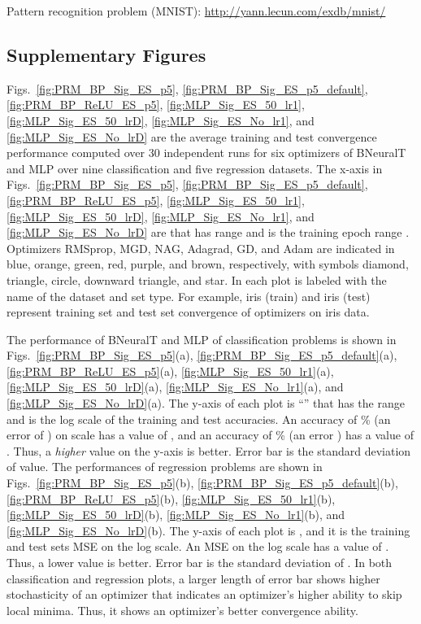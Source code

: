 \documentclass[11pt,a4paper]{article}
\begin{document}
    Pattern recognition problem (MNIST):
\url{http://yann.lecun.com/exdb/mnist/}


    \subsection{Supplementary Figures}
    \label{sec:convergece_figs}
    Figs.~\ref{fig:PRM_BP_Sig_ES_p5}, 
    \ref{fig:PRM_BP_Sig_ES_p5_default}, 
    \ref{fig:PRM_BP_ReLU_ES_p5}, 
    \ref{fig:MLP_Sig_ES_50_lr1},
    \ref{fig:MLP_Sig_ES_50_lrD}, 
    \ref{fig:MLP_Sig_ES_No_lr1}, and 
    \ref{fig:MLP_Sig_ES_No_lrD} 
are the average training and test convergence performance computed over 30 independent runs for six optimizers of BNeuralT  and MLP over nine classification and five regression datasets. The x-axis in 
Figs.~\ref{fig:PRM_BP_Sig_ES_p5}, 
    \ref{fig:PRM_BP_Sig_ES_p5_default}, 
    \ref{fig:PRM_BP_ReLU_ES_p5}, 
    \ref{fig:MLP_Sig_ES_50_lr1},
    \ref{fig:MLP_Sig_ES_50_lrD}, 
    \ref{fig:MLP_Sig_ES_No_lr1}, and 
    \ref{fig:MLP_Sig_ES_No_lrD}  
are  that has range  and is the training epoch range . Optimizers RMSprop, MGD, NAG, Adagrad, GD, and Adam are indicated in blue, orange, green, red, purple, and brown, respectively, with symbols diamond, triangle, circle, downward triangle, and star. In each plot is labeled with the name of the dataset and set type. For example, iris (train) and iris (test) represent training set and test set convergence of optimizers on iris data.
    
    The performance of BNeuralT and MLP of classification problems is shown in Figs.~\ref{fig:PRM_BP_Sig_ES_p5}(a), 
    \ref{fig:PRM_BP_Sig_ES_p5_default}(a), 
    \ref{fig:PRM_BP_ReLU_ES_p5}(a), 
    \ref{fig:MLP_Sig_ES_50_lr1}(a),
    \ref{fig:MLP_Sig_ES_50_lrD}(a), 
    \ref{fig:MLP_Sig_ES_No_lr1}(a), and 
    \ref{fig:MLP_Sig_ES_No_lrD}(a).
The y-axis of each plot is ``'' that has the range  and is the log scale of the training and test  accuracies. An  accuracy of \% (an error of ) on  scale has a value of , and an accuracy of \% (an error ) has a value of . Thus, a \textit{higher} value on the y-axis is better. Error bar is the standard deviation of  value. 
The performances of regression problems are shown in Figs.~\ref{fig:PRM_BP_Sig_ES_p5}(b), 
    \ref{fig:PRM_BP_Sig_ES_p5_default}(b), 
    \ref{fig:PRM_BP_ReLU_ES_p5}(b), 
    \ref{fig:MLP_Sig_ES_50_lr1}(b),
    \ref{fig:MLP_Sig_ES_50_lrD}(b), 
    \ref{fig:MLP_Sig_ES_No_lr1}(b), and 
    \ref{fig:MLP_Sig_ES_No_lrD}(b).  
The y-axis of each plot is , and it is the training and test sets MSE on the log scale. An MSE  on the log scale has a value of . Thus, a lower value is better. Error bar is the standard deviation of . In both classification and regression plots, a larger length of error bar shows higher stochasticity of an optimizer that indicates an optimizer's higher ability to skip local minima. Thus, it shows an optimizer's better convergence ability.
\end{document}
